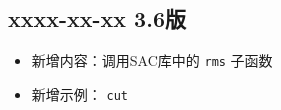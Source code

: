 \subsection*{xxxx-xx-xx 3.6版}
\begin{itemize}
\item 新增内容：调用SAC库中的 \texttt{rms} 子函数
\item 新增示例： \texttt{cut}
\end{itemize}
